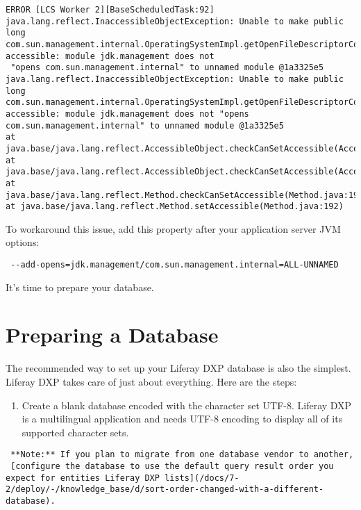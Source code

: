 \begin{verbatim}
ERROR [LCS Worker 2][BaseScheduledTask:92] java.lang.reflect.InaccessibleObjectException: Unable to make public long com.sun.management.internal.OperatingSystemImpl.getOpenFileDescriptorCount() accessible: module jdk.management does not
 "opens com.sun.management.internal" to unnamed module @1a3325e5
java.lang.reflect.InaccessibleObjectException: Unable to make public long com.sun.management.internal.OperatingSystemImpl.getOpenFileDescriptorCount() accessible: module jdk.management does not "opens com.sun.management.internal" to unnamed module @1a3325e5
at java.base/java.lang.reflect.AccessibleObject.checkCanSetAccessible(AccessibleObject.java:
at java.base/java.lang.reflect.AccessibleObject.checkCanSetAccessible(AccessibleObject.java:
at java.base/java.lang.reflect.Method.checkCanSetAccessible(Method.java:198)
at java.base/java.lang.reflect.Method.setAccessible(Method.java:192)
\end{verbatim}

To workaround this issue, add this property after your application
server JVM options:

\begin{verbatim}
 --add-opens=jdk.management/com.sun.management.internal=ALL-UNNAMED
\end{verbatim}

It's time to prepare your database.

\section{Preparing a Database}\label{preparing-a-database}

The recommended way to set up your Liferay DXP database is also the
simplest. Liferay DXP takes care of just about everything. Here are the
steps:

\begin{enumerate}
\def\labelenumi{\arabic{enumi}.}
\tightlist
\item
  Create a blank database encoded with the character set UTF-8. Liferay
  DXP is a multilingual application and needs UTF-8 encoding to display
  all of its supported character sets.
\end{enumerate}

\noindent\hrulefill

\begin{verbatim}
 **Note:** If you plan to migrate from one database vendor to another,
 [configure the database to use the default query result order you expect for entities Liferay DXP lists](/docs/7-2/deploy/-/knowledge_base/d/sort-order-changed-with-a-different-database). 
\end{verbatim}

